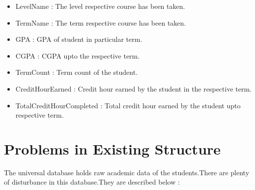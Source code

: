 \begin{itemize}
\item LevelName : The level respective course has been taken.
\item TermName : The term respective course has been taken.
\item GPA : GPA of student in particular term.
\item CGPA : CGPA upto the respective term.
\item TermCount : Term count of the student.
\item CreditHourEarned : Credit hour earned by the student in the respective term.
\item TotalCreditHourCompleted : Total credit hour earned by the student upto respective term.
\end{itemize}



\section{Problems in Existing Structure}
The universal database holds raw academic data of the students.There are plenty of disturbance in this database.They are described below :
